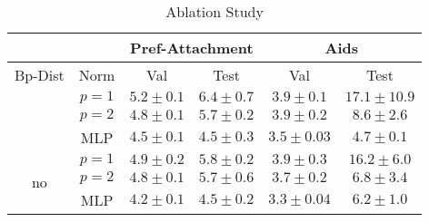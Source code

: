 \begin{table}[htbp]
    \addtolength{\tabcolsep}{-1pt}
    \fontsize{9pt}{10.25pt}\selectfont
    \centering
    \renewcommand{\arraystretch}{1.2}
    \begin{tabular}{|c|c|c|c|c|c|}
        \hline
        \multicolumn{2}{|c|}{} & \multicolumn{2}{c|}{Pref-Attachment} & \multicolumn{2}{c|}{Aids} \\ \hline
        Bp-Dist & Norm & Val & Test & Val & Test \\ \hhline{|=|=|=|=|=|=|}
        \multirow{3}{*}{yes} & $p=1$ & $5.2 \pm 0.1$ & $6.4 \pm 0.7$ & $3.9 \pm 0.1$ & $17.1 \pm 10.9$ \\ \hhline{|~|-|-|-|-|-|}
        & $p=2$ & $4.8 \pm 0.1$ & $5.7 \pm 0.2$ & $3.9 \pm 0.2$ & $8.6 \pm 2.6$ \\ \hhline{|~|-|-|-|-|-|}
        & MLP & $4.5 \pm 0.1$ & $4.5 \pm 0.3$ & $3.5 \pm 0.03$ & $4.7 \pm 0.1$ \\ \hline
        \multirow{3}{*}{no}  & $p=1$ & $4.9 \pm 0.2$ & $5.8 \pm 0.2$ & $3.9 \pm 0.3$ & $16.2 \pm 6.0$ \\ \hhline{|~|-|-|-|-|-|}
        & $p=2$ & $4.8 \pm 0.1$ & $5.7 \pm 0.6$ & $3.7 \pm 0.2$ & $6.8 \pm 3.4$ \\ \hhline{|~|-|-|-|-|-|}
        & MLP & $4.2 \pm 0.1$ & $4.5 \pm 0.2$ & $3.3 \pm 0.04$ & $6.2 \pm 1.0$ \\ \hline
    \end{tabular}
    \caption{Ablation Study}
    \label{tab:ex1-ablation}
\end{table}

